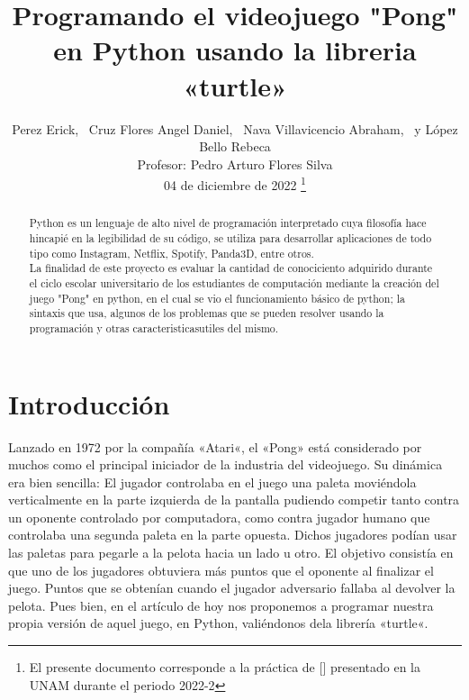 \documentclass[journal]{IEEEtran}
\begin{document}
\title{\large{\textbf{Programando el videojuego "Pong" en Python usando la libreria «turtle»}}}
\author{Perez Erick,~
        Cruz Flores Angel Daniel,~
        Nava Villavicencio Abraham,~
        y López Bello Rebeca\\
				Profesor: Pedro Arturo Flores Silva \\\vspace{0.5cm}
\small{04 de diciembre de 2022}
\thanks{El presente documento corresponde a la práctica de [] presentado en la UNAM durante el periodo 2022-2}}



\maketitle

\begin{abstract}
Python es un lenguaje de alto nivel de programación interpretado cuya filosofía hace hincapié en la legibilidad de su código, se utiliza para desarrollar aplicaciones de todo tipo como Instagram, Netflix, Spotify, Panda3D, entre otros.\\
La finalidad de este proyecto es evaluar la cantidad de conociciento adquirido durante el ciclo escolar universitario de los estudiantes de computación mediante la creación del juego "Pong" en python, en el cual se vio el funcionamiento básico de python; la sintaxis que usa, algunos de los problemas que se pueden resolver usando la programación y otras caracteristicasutiles del mismo.
\end{abstract}


\section{Introducción}
Lanzado en 1972 por la compañía «Atari«, el «Pong» está considerado por muchos como el principal iniciador de la industria del videojuego. Su dinámica era bien sencilla: El jugador controlaba en el juego una paleta moviéndola verticalmente en la parte izquierda de la pantalla pudiendo competir tanto contra un oponente controlado por computadora, como contra jugador humano que controlaba una segunda paleta en la parte opuesta. Dichos jugadores podían usar las paletas para pegarle a la pelota hacia un lado u otro. El objetivo consistía en que uno de los jugadores obtuviera más puntos que el oponente al finalizar el juego. Puntos que se obtenían cuando el jugador adversario fallaba al devolver la pelota. Pues bien, en el artículo de hoy nos proponemos a programar nuestra propia versión de aquel juego, en Python, valiéndonos dela librería «turtle«.
\end{document}
